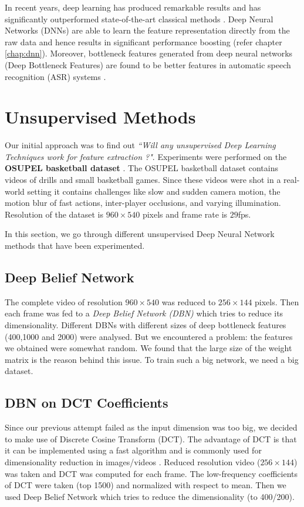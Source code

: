 In recent years, deep learning has produced remarkable results and has significantly outperformed state-of-the-art classical methods \cite{KarpathyCVPR14}.  Deep Neural Networks (DNNs) are able to learn the feature representation directly from the raw data and hence results in significant performance boosting (refer chapter \ref{chap:dnn}).  Moreover, bottleneck features generated from deep neural networks (Deep Bottleneck Features) are found to be better features in automatic speech recognition (ASR) systems \cite{yu2011improved,gehring2013extracting}.

\section{Unsupervised Methods}
\label{sec:event:unsupervised}
Our initial approach was to find out \textit{``Will any unsupervised Deep Learning Techniques work for feature extraction ?"}.  Experiments were performed on the \textbf{OSUPEL basketball dataset} \cite{brendel2011probabilistic}.  The OSUPEL basketball dataset contains videos of drills and small basketball games.  Since these videos were shot in a real-world setting it contains challenges like slow and sudden camera motion, the motion blur of fast actions, inter-player occlusions, and varying illumination.  Resolution of the dataset is $960 \times 540$ pixels and frame rate is $29$fps.

In this section, we go through different unsupervised Deep Neural Network methods that have been experimented.

\subsection{Deep Belief Network} 
The complete video of resolution $960 \times 540$ was reduced to $256 \times 144$ pixels.  Then each frame was fed to a \textit{Deep Belief Network (DBN)} which tries to reduce its dimensionality.  Different DBNs with different sizes of deep bottleneck features (400,1000 and 2000) were analysed.  But we encountered a problem: the features we obtained were somewhat random.  We found that the large size of the weight matrix is the reason behind this issue.  To train such a big network, we need a big dataset.

\subsection{DBN on DCT Coefficients}
Since our previous attempt failed as the input dimension was too big, we decided to make use of Discrete Cosine Transform (DCT).  The advantage of DCT is that it can be implemented using a fast algorithm and is commonly used for dimensionality reduction in images/videos \cite{er2005high}.  Reduced resolution video ($256 \times 144$) was taken and DCT was computed for each frame.  The low-frequency coefficients of DCT were taken (top 1500) and normalized with respect to mean.  Then we used Deep Belief Network which tries to reduce the dimensionality (to 400/200).

